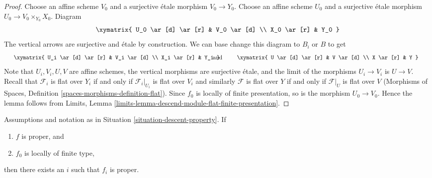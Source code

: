 \begin{proof}
Choose an affine scheme $V_0$ and a surjective \'etale morphism
$V_0 \to Y_0$. Choose an affine scheme $U_0$ and a surjective \'etale
morphism $U_0 \to V_0 \times_{Y_0} X_0$. Diagram
$$
\xymatrix{
U_0 \ar[d] \ar[r] & V_0 \ar[d] \\
X_0 \ar[r] & Y_0
}
$$
The vertical arrows are surjective and \'etale by construction.
We can base change this diagram to $B_i$ or $B$ to get
$$
\vcenter{
\xymatrix{
U_i \ar[d] \ar[r] & V_i \ar[d] \\
X_i \ar[r] & Y_i
}
}
\quad\text{and}\quad
\vcenter{
\xymatrix{
U \ar[d] \ar[r] & V \ar[d] \\
X \ar[r] & Y
}
}
$$
Note that $U_i, V_i, U, V$ are affine schemes, the vertical morphisms are
surjective \'etale, and the limit of the morphisms $U_i \to V_i$ is
$U \to V$. Recall that $\mathcal{F}_i$ is flat over $Y_i$ if and only if
$\mathcal{F}_i|_{U_i}$ is flat over $V_i$ and similarly $\mathcal{F}$ is flat
over $Y$ if and only if $\mathcal{F}|_U$ is flat over $V$
(Morphisms of Spaces, Definition \ref{spaces-morphisms-definition-flat}).
Since $f_0$ is locally of finite presentation, so is the morphism
$U_0 \to V_0$. Hence the lemma follows
from Limits, Lemma \ref{limits-lemma-descend-module-flat-finite-presentation}.
\end{proof}

\begin{lemma}
\label{lemma-eventually-proper}
Assumptions and notation as in Situation \ref{situation-descent-property}.
If
\begin{enumerate}
\item $f$ is proper, and
\item $f_0$ is locally of finite type,
\end{enumerate}
then there exists an $i$ such that $f_i$ is proper.
\end{lemma}


